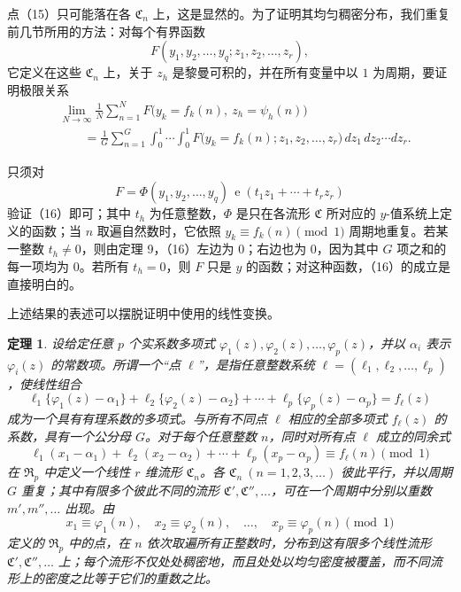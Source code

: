 \documentclass[UTF8,11pt,a4paper,fontset=none]{ctexart}
\theoremstyle{weylthm}
\newtheorem{theorem}{定理}
\newcommand{\e}{\operatorname{e}}
\begin{document}
点（15）只可能落在各 \(\mathfrak C_n\) 上，这是显然的。为了证明其均匀稠密分布，我们重复前几节所用的方法：对每个有界函数
\[
  F(y_1,y_2,\ldots,y_q;z_1,z_2,\ldots,z_r),
\]
它定义在这些 \(\mathfrak C_n\) 上，关于 \(z_h\) 是黎曼可积的，并在所有变量中以
\(1\) 为周期，要证明极限关系
\begin{equation}
\begin{aligned}
 &\lim_{N\to\infty}\frac1N\sum_{n=1}^{N}
 F\bigl(y_k=f_k(n),\ z_h=\psi_h(n)\bigr)\\
 &\qquad=\frac1G\sum_{n=1}^{G}
 \int_0^1\!\cdots\!\int_0^1
 F\bigl(y_k=f_k(n);z_1,z_2,\ldots,z_r\bigr)
 \,dz_1\,dz_2\cdots dz_r.
\end{aligned}
\tag{16}
\end{equation}

只须对
\[
  F=\Phi(y_1,y_2,\ldots,y_q)\,
     \e(t_1z_1+\cdots+t_rz_r)
\]
验证（16）即可；其中 \(t_h\) 为任意整数，\(\Phi\) 是只在各流形
\(\mathfrak C\) 所对应的 \(y\)-值系统上定义的函数；当 \(n\) 取遍自然数时，它依照
\(y_k\equiv f_k(n)\pmod 1\) 周期地重复。若某一整数 \(t_h\neq0\)，则由定理 9，（16）左边为
\(0\)；右边也为 \(0\)，因为其中 \(G\) 项之和的每一项均为 \(0\)。若所有
\(t_h=0\)，则 \(F\) 只是 \(y\) 的函数；对这种函数，（16）的成立是直接明白的。

上述结果的表述可以摆脱证明中使用的线性变换。

\begin{theorem}
设给定任意 \(p\) 个实系数多项式
\(\varphi_1(z),\varphi_2(z),\ldots,\varphi_p(z)\)，并以
\(\alpha_i\) 表示 \(\varphi_i(z)\) 的常数项。所谓一个“点
\(\boldsymbol\ell\)”，是指任意整数系统
\(\boldsymbol\ell=(\ell_1,\ell_2,\ldots,\ell_p)\)，使线性组合
\[
  \ell_1\{\varphi_1(z)-\alpha_1\}
 +\ell_2\{\varphi_2(z)-\alpha_2\}
 +\cdots
 +\ell_p\{\varphi_p(z)-\alpha_p\}
 =f_{\boldsymbol\ell}(z)
\]
成为一个具有有理系数的多项式。与所有不同点
\(\boldsymbol\ell\) 相应的全部多项式
\(f_{\boldsymbol\ell}(z)\) 的系数，具有一个公分母 \(G\)。对于每个任意整数
\(n\)，同时对所有点 \(\boldsymbol\ell\) 成立的同余式
\[
  \ell_1(x_1-\alpha_1)+\ell_2(x_2-\alpha_2)+\cdots
  +\ell_p(x_p-\alpha_p)
  \equiv f_{\boldsymbol\ell}(n)\pmod 1
\]
在 \(\mathfrak R_p\) 中定义一个线性 \(r\) 维流形
\(\mathfrak C_n\)。各 \(\mathfrak C_n\ (n=1,2,3,\ldots)\) 彼此平行，并以周期
\(G\) 重复；其中有限多个彼此不同的流形
\(\mathfrak C',\mathfrak C'',\ldots\)，可在一个周期中分别以重数
\(m',m'',\ldots\) 出现。由
\[
  x_1\equiv\varphi_1(n),\quad x_2\equiv\varphi_2(n),\quad\ldots,\quad
  x_p\equiv\varphi_p(n)\pmod 1
\]
定义的 \(\mathfrak R_p\) 中的点，在 \(n\) 依次取遍所有正整数时，分布到这有限多个线性流形
\(\mathfrak C',\mathfrak C'',\ldots\) 上；每个流形不仅处处稠密地，而且处处以均匀密度被覆盖，而不同流形上的密度之比等于它们的重数之比。
\end{theorem}
\end{document}
